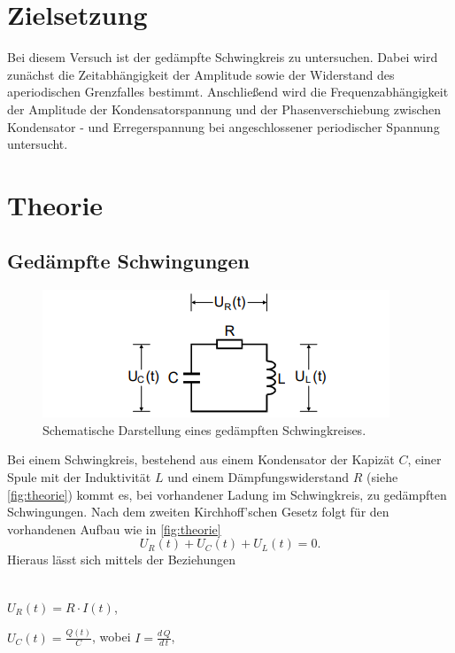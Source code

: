 \section{Zielsetzung}
    Bei diesem Versuch ist der gedämpfte Schwingkreis zu untersuchen. Dabei wird zunächst die Zeitabhängigkeit der Amplitude sowie
    der Widerstand des aperiodischen Grenzfalles bestimmt. Anschließend wird die Frequenzabhängigkeit der Amplitude der Kondensatorspannung
    und der Phasenverschiebung zwischen Kondensator - und Erregerspannung bei angeschlossener periodischer Spannung untersucht.
\section{Theorie}
    \label{sec:Theorie}
    \subsection{Gedämpfte Schwingungen}
        \begin{figure}
            \centering
            \includegraphics[width=\textwidth]{content/theorie.png}
            \caption{Schematische Darstellung eines gedämpften Schwingkreises\cite[284]{V354}.}
            \label{fig:theorie}
        \end{figure} 
        Bei einem Schwingkreis, bestehend aus einem Kondensator der Kapizät $C$, einer Spule mit der Induktivität $L$
        und einem Dämpfungswiderstand $R$ (siehe \autoref{fig:theorie}) kommt es, bei vorhandener Ladung im Schwingkreis, zu gedämpften 
        Schwingungen. Nach dem zweiten Kirchhoff'schen Gesetz folgt für den vorhandenen Aufbau wie in \autoref{fig:theorie}
        \begin{equation}
            \label{eqn:kirchhoff}
            U_R(t) + U_C(t) + U_L(t) = 0.
        \end{equation}
        Hieraus lässt sich mittels der Beziehungen
        \\ \\
        \centerline{$U_R(t) = R \cdot I(t)$,}
        \centerline{$U_C(t) = \frac{Q(t)}{C}$, wobei $I = \frac{d \, Q}{d \, t}$,}
